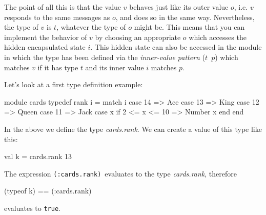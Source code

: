 \documentclass[11pt]{amsart}
\newcommand{\babelsrc}[1] {\lstinline!#1!}
\begin{document}
The point of all this is that the value $v$ behaves just like its outer value $o$, i.e. $v$ responds to the same messages as $o$, and does so in the same way. Nevertheless, the type of $v$ is $t$, whatever the type of $o$ might be. This means that you can implement the behavior of $v$ by choosing an appropriate $o$ which accesses the hidden encapsulated state $i$. This hidden state can also be accessed in the module in which the type has been defined via the \emph{inner-value pattern} ($t$\ $p$) which matches $v$ if it has type $t$ and its inner value $i$ matches $p$.

Let's look at a first type definition example:
\begin{babellisting}
module cards
  typedef rank i = 
    match i 
      case 14 => Ace
      case 13 => King
      case 12 => Queen
      case 11 => Jack
      case x if 2 <= x <= 10 => Number x
    end
end
\end{babellisting}
In the above we define the type \emph{cards.rank}. We can create a value of this type like this:
\begin{babellisting}
val k = cards.rank 13
\end{babellisting}
The expression \babelsrc{(:cards.rank)}\ evaluates to the type \emph{cards.rank}, therefore 
\begin{babellisting}
(typeof k) == (:cards.rank)
\end{babellisting}
evaluates to \babelsrc{true}. 
\end{document}
